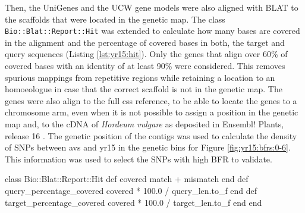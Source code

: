 Then, the UniGenes and the UCW gene models were also aligned with BLAT to the scaffolds that were located in the genetic map.  
The class \texttt{Bio::Blat::Report::Hit}  was extended to calculate how many bases are covered in the alignment and the percentage of covered bases in both, the target and query sequences (Listing \ref{lst:yr15:hit}).
Only the genes that align over 60\% of covered bases with an identity of at least 90\% were considered. 
This removes spurious mappings from repetitive regions while retaining a location to an homoeologue in case that the correct scaffold is not in the genetic map. 
The genes were also align to the full \acrshort{css} reference, to be able to locate the genes to a chromosome arm, even when it is not possible to assign a position in the genetic map and, to the cDNA of \textit{Hordeum vulgare} \citep{Mayer2011} as deposited in Ensembl! Plants, release 16 \citep{Kersey2012}. 
The genetic position of the contigs was used to calculate the density of SNPs between \acrshort{avs} and \acrshort{yr15} in the genetic bins for Figure \ref{fig:yr15:bfrs:0-6}. 
This information was used to select the SNPs with high BFR to validate.  

\begin{code}[language=Ruby, caption=Extension from \texttt{Bio::Blat::Report::Hit} to improve the filtering of spurious alignments., label=lst:yr15:hit]
class Bio::Blat::Report::Hit
  def covered
    match + mismatch
  end
  def query_percentage_covered
    covered * 100.0 / query_len.to_f
  end
  def target_percentage_covered
    covered * 100.0 / target_len.to_f
  end
end
\end{code}

